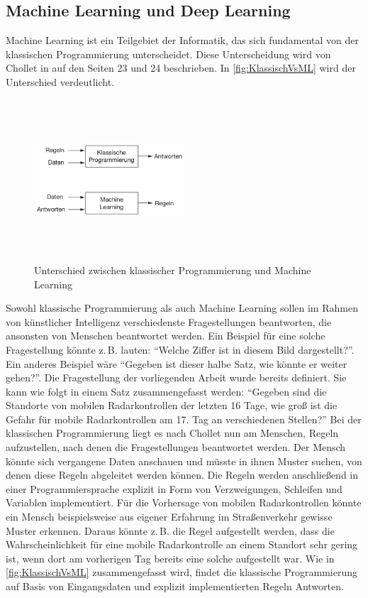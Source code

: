 \subsection{Machine Learning und Deep Learning}
\label{sec:MachineDeepLearning}

Machine Learning ist ein Teilgebiet der Informatik, das sich fundamental von der klassischen Programmierung unterscheidet.
Diese Unterscheidung wird von Chollet in \cite{DeepLearningPythonKeras} auf den Seiten 23 und 24 beschrieben.
In \autoref{fig:KlassischVsML} wird der Unterschied verdeutlicht.

\begin{figure}[h]
    \centering
    \includegraphics[width=0.5\textwidth,height=6cm,keepaspectratio=true]{content/images/KlassischVsML.png}
    \caption{Unterschied zwischen klassischer Programmierung und Machine Learning \cite[Abb.~1.2]{DeepLearningPythonKeras}}
    \label{fig:KlassischVsML}
\end{figure}

Sowohl klassische Programmierung als auch Machine Learning sollen im Rahmen von künstlicher Intelligenz verschiedenste Fragestellungen beantworten, die ansonsten von Menschen beantwortet werden.
Ein Beispiel für eine solche Fragestellung könnte z.\,B. lauten: "`Welche Ziffer ist in diesem Bild dargestellt?"'.
Ein anderes Beispiel wäre "`Gegeben ist dieser halbe Satz, wie könnte er weiter gehen?"'.
Die Fragestellung der vorliegenden Arbeit wurde bereits definiert.
Sie kann wie folgt in einem Satz zusammengefasst werden:
"`Gegeben sind die Standorte von mobilen Radarkontrollen der letzten 16 Tage, wie groß ist die Gefahr für mobile Radarkontrollen am 17. Tag an verschiedenen Stellen?"'
Bei der klassischen Programmierung liegt es nach Chollet nun am Menschen, Regeln aufzustellen, nach denen die Fragestellungen beantwortet werden.
Der Mensch könnte sich vergangene Daten anschauen und müsste in ihnen Muster suchen, von denen diese Regeln abgeleitet werden können.
Die Regeln werden anschließend in einer Programmiersprache explizit in Form von Verzweigungen, Schleifen und Variablen implementiert.
Für die Vorhersage von mobilen Radarkontrollen könnte ein Mensch beispielsweise aus eigener Erfahrung im Straßenverkehr gewisse Muster erkennen.
Daraus könnte z.\,B. die Regel aufgestellt werden, dass die Wahrscheinlichkeit für eine mobile Radarkontrolle an einem Standort sehr gering ist, wenn dort am vorherigen Tag bereits eine solche aufgestellt war.
Wie in \autoref{fig:KlassischVsML} zusammengefasst wird, findet die klassische Programmierung auf Basis von Eingangsdaten und explizit implementierten Regeln Antworten.


